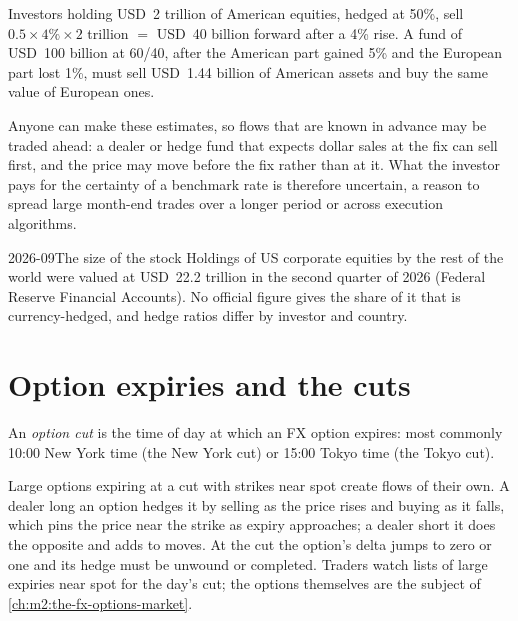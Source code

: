 \begin{example}\label{ex:m2:fixings-and-flows:flows}
Investors holding USD~2 trillion of American equities, hedged at 50\%, sell
$0.5 \times 4\% \times 2$ trillion $=$ USD~40 billion forward after a 4\% rise. A
fund of USD~100 billion at 60/40, after the American part gained 5\% and the
European part lost 1\%, must sell USD~1.44 billion of American assets and buy the
same value of European ones.
\end{example}

Anyone can make these estimates, so flows that are known in advance may be
traded ahead: a dealer or hedge fund that expects dollar sales at the fix can
sell first, and the price may move before the fix rather than at it. What the
investor pays for the certainty of a benchmark rate is therefore uncertain, a
reason to spread large month-end trades over a longer period or across
execution algorithms.

\begin{dated}{2026-09}{The size of the stock}\label{dat:m2:fixings-and-flows:size}
Holdings of US corporate equities by the rest of the world were valued at
USD~22.2 trillion in the second quarter of 2026 (Federal Reserve Financial
Accounts). No official figure gives the share of it that is currency-hedged,
and hedge ratios differ by investor and country.
\end{dated}

\section{Option expiries and the cuts}

\begin{definition}\label{def:m2:fixings-and-flows:cut}
An \emph{option cut} is the time of day at which an FX option
expires: most commonly 10:00 New York time (the New York cut) or 15:00 Tokyo
time (the Tokyo cut).
\end{definition}

Large options expiring at a cut with strikes near spot create flows of their own.
A dealer long an option hedges it by selling as the price rises and buying as it
falls, which pins the price near the strike as expiry approaches; a dealer short
it does the opposite and adds to moves. At the cut the option's delta jumps to
zero or one and its hedge must be unwound or completed. Traders watch lists of
large expiries near spot for the day's cut; the options themselves are the subject
of \cref{ch:m2:the-fx-options-market}.

